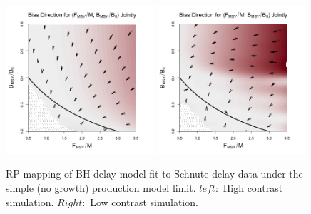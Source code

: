 %
\begin{figure}[h!]
\includegraphics[width=0.49\textwidth]{../ddBias/directionalBiasDDSubExpT45N300AS0.1K10.png}
\includegraphics[width=0.49\textwidth]{../ddBias/directionalBiasDDSubFlatT45N150A0-1AS0.1K10N56.png}
\caption{
RP mapping of BH delay model fit to Schnute delay data under the simple (no
growth) production model limit. $left:$ High contrast simulation.
$Right:$ Low contrast simulation.
}\label{prodLimit}
\end{figure}


